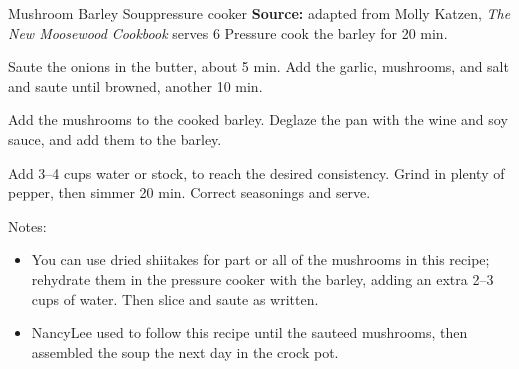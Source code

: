 \begin{recipe}[]{Mushroom Barley Soup}{pressure cooker \hfill }%
 {\textbf{Source:} adapted from Molly Katzen, \textit{The New Moosewood Cookbook} \hfill serves 6}
 Pressure cook the barley for 20 min.

 Saute the onions in the butter, about 5 min. Add the garlic, mushrooms, and salt and saute until browned, another 10 min.

 Add the mushrooms to the cooked barley. Deglaze the pan with the wine and soy sauce, and add them to the barley.

 Add 3--4 cups water or stock, to reach the desired consistency. Grind in plenty of pepper, then simmer 20 min. Correct seasonings and serve.

 \freeform Notes:
 \begin{itemize}
  \item You can use dried shiitakes for part or all of the mushrooms in this recipe; rehydrate them in the pressure cooker with the barley, adding an extra 2--3 cups of water. Then slice and saute as written.
  \item NancyLee used to follow this recipe until the sauteed mushrooms, then assembled the soup the next day in the crock pot.
 \end{itemize}
\end{recipe}
